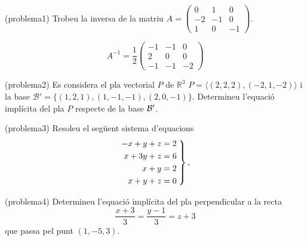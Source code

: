 \documentclass[12pt,noanswers]{exam}
\begin{document}
\begin{questions}

  \question (problema1) Trobeu la inversa de la matriu $A = \begin{pmatrix}0 & 1 & 0\\ -2 & -1 & 0\\ 1 & 0 & -1\end{pmatrix}$.

    $$A^{-1}=\frac{1}{2}\begin{pmatrix}-1 & -1 & 0\\ 2 & 0 & 0\\ -1 & -1 & -2\end{pmatrix}$$
    

  \question (problema2) 
  Es considera el pla vectorial $P$ de $\mathbb{R}^ 3$
  $P = \langle(2,2,2), (-2,1,-2)\rangle$
  i la base $\mathcal B'=\{(1,2,1),(1,-1,-1),(2,0,-1)\}$. Determineu l'equació implícita del pla $P$ respecte de la base $\cal B'$.
  

  \question (problema3) 
  Resoleu el següent sistema d'equacions
  $$ \left.\aligned - x + y + z &= 2 \\ x + 3 y + z &= 6 \\ x + y &= 2 \\ x + y + z &= 0 \endaligned\;\right\}, $$
  

  \question (problema4) 
  Determineu l'equació implícita del pla perpendicular a la recta
  $$\frac{x + 3}{3} = \frac{y - 1}{3} = z + 3$$ que passa pel punt $(1,-5,3)$.
  

\end{questions}
\end{document}
